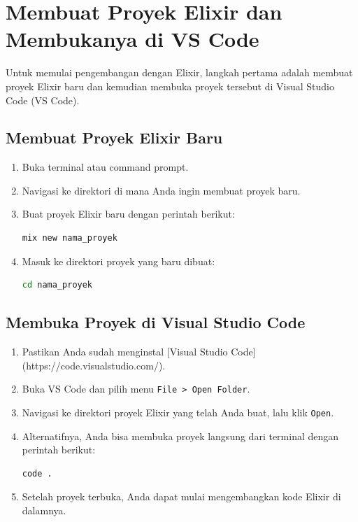 \section{Membuat Proyek Elixir dan Membukanya di VS Code}

Untuk memulai pengembangan dengan Elixir, langkah pertama adalah membuat proyek Elixir baru dan kemudian membuka proyek tersebut di Visual Studio Code (VS Code).

\subsection{Membuat Proyek Elixir Baru}

\begin{enumerate}
	\item Buka terminal atau command prompt.
	\item Navigasi ke direktori di mana Anda ingin membuat proyek baru.
	\item Buat proyek Elixir baru dengan perintah berikut:
	\begin{lstlisting}[language=bash]
		mix new nama_proyek
	\end{lstlisting}
	\item Masuk ke direktori proyek yang baru dibuat:
	\begin{lstlisting}[language=bash]
		cd nama_proyek
	\end{lstlisting}
\end{enumerate}

\subsection{Membuka Proyek di Visual Studio Code}

\begin{enumerate}
	\item Pastikan Anda sudah menginstal [Visual Studio Code](https://code.visualstudio.com/).
	\item Buka VS Code dan pilih menu \texttt{File > Open Folder}.
	\item Navigasi ke direktori proyek Elixir yang telah Anda buat, lalu klik \texttt{Open}.
	\item Alternatifnya, Anda bisa membuka proyek langsung dari terminal dengan perintah berikut:
	\begin{lstlisting}[language=bash]
		code .
	\end{lstlisting}
	\item Setelah proyek terbuka, Anda dapat mulai mengembangkan kode Elixir di dalamnya.
\end{enumerate}

